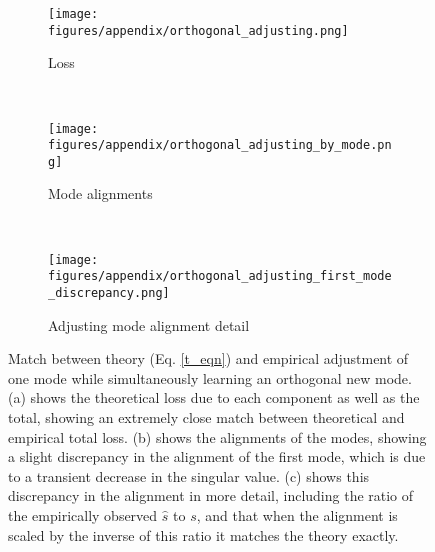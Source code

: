 \documentclass{article}
\begin{document}
\begin{figure}
\centering
\begin{subfigure}[b]{0.49\textwidth}
\texttt{[image: figures/appendix/orthogonal\_adjusting.png]}
\caption{Loss} 
\end{subfigure}~%
\begin{subfigure}[b]{0.49\textwidth}
\texttt{[image: figures/appendix/orthogonal\_adjusting\_by\_mode.png]}
\caption{Mode alignments} 
\end{subfigure}\\
\begin{subfigure}[b]{0.49\textwidth}
\texttt{[image: figures/appendix/orthogonal\_adjusting\_first\_mode\_discrepancy.png]}
\caption{Adjusting mode alignment detail} 
\end{subfigure}
\caption{Match between theory (Eq. \ref{t_eqn}) and empirical adjustment of one mode while simultaneously learning an orthogonal new mode. (a) shows the theoretical loss due to each component as well as the total, showing an extremely close match between theoretical and empirical total loss. (b) shows the alignments of the modes, showing a slight discrepancy in the alignment of the first mode, which is due to a transient decrease in the singular value. (c) shows this discrepancy in the alignment in more detail, including the ratio of the empirically observed $\hat{s}$ to $s$, and that when the alignment is scaled by the inverse of this ratio it matches the theory exactly.}
\label{orth_adj_fig}
\end{figure}
\end{document}
